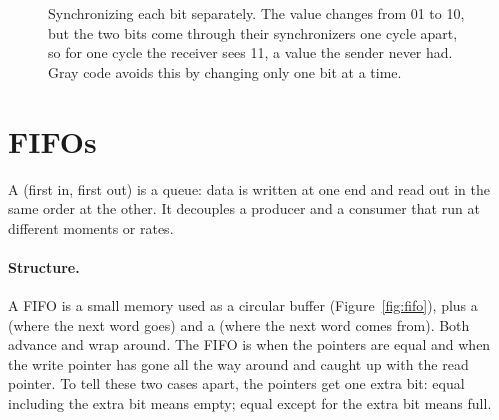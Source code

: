 \begin{figure}[h]
\centering
{}
\caption{Synchronizing each bit separately. The value changes from 01 to 10, but the two bits come through their synchronizers one cycle apart, so for one cycle the receiver sees 11, a value the sender never had. Gray code avoids this by changing only one bit at a time.}
\label{fig:multibitcdc}
\end{figure}

\section{FIFOs}

A  (first in, first out) is a queue: data is written at one end and read out in the same order at the other. It decouples a producer and a consumer that run at different moments or rates.

\paragraph{Structure.} A FIFO is a small memory used as a circular buffer (Figure~\ref{fig:fifo}), plus a  (where the next word goes) and a  (where the next word comes from). Both advance and wrap around. The FIFO is  when the pointers are equal and  when the write pointer has gone all the way around and caught up with the read pointer. To tell these two cases apart, the pointers get one extra bit: equal including the extra bit means empty; equal except for the extra bit means full.

